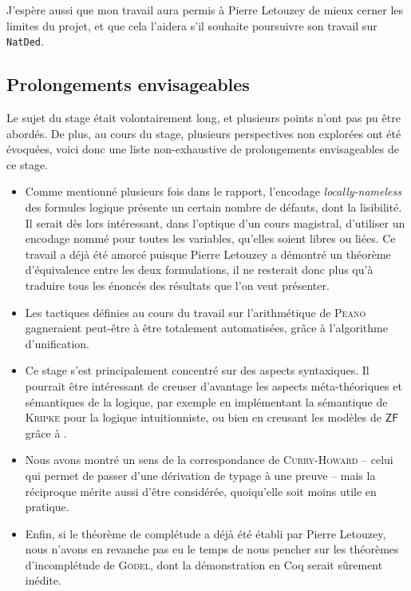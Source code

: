 \documentclass[a4paper]{article}
\newcommand{\ZF}{\mathsf{ZF}}
\theoremstyle{remark}
\theoremstyle{remark}
\theoremstyle{remark}
\theoremstyle{definition}
\theoremstyle{definition}
\theoremstyle{definition}
\begin{document}
J'espère aussi que mon travail aura permis à Pierre Letouzey de mieux cerner les limites du projet, et que cela l'aidera s'il souhaite poursuivre son travail sur \verb+NatDed+.

\subsection*{Prolongements envisageables}

Le sujet du stage était volontairement long, et plusieurs points n'ont pas pu être abordés. De plus, au cours du stage, plusieurs perspectives non explorées ont été évoquées, voici donc une liste non-exhaustive de prolongements envisageables de ce stage.

\begin{itemize}[label=$\bigstar$]
\item Comme mentionné plusieurs fois dans le rapport, l'encodage \emph{locally-nameless} des formules logique présente un certain nombre de défauts, dont la lisibilité. Il serait dès lors intéressant, dans l'optique d'un cours magistral, d'utiliser un encodage nommé pour toutes les variables, qu'elles soient libres ou liées. Ce travail a déjà été amorcé puisque Pierre Letouzey a démontré un théorème d'équivalence entre les deux formulations, il ne resterait donc plus qu'à traduire tous les énoncés des résultats que l'on veut présenter.

\item Les tactiques définies au cours du travail sur l'arithmétique de \textsc{Peano} gagneraient peut-être à être totalement automatisées, grâce à l'algorithme d'unification.

\item Ce stage s'est principalement concentré sur des aspects syntaxiques. Il pourrait être intéressant de creuser d'avantage les aspects méta-théoriques et sémantiques de la logique, par exemple en implémentant la sémantique de \textsc{Kripke} pour la logique intuitionniste, ou bien en creusant les modèles de $\ZF$ grâce à \cite{zfmod}.

\item Nous avons montré un sens de la correspondance de \textsc{Curry-Howard} -- celui qui permet de passer d'une dérivation de typage à une preuve -- mais la réciproque mérite aussi d'être considérée, quoiqu'elle soit moins utile en pratique.

\item Enfin, si le théorème de complétude a déjà été établi par Pierre Letouzey, nous n'avons en revanche pas eu le temps de nous pencher sur les théorèmes d'incomplétude de \textsc{Gödel}, dont la démonstration en Coq serait sûrement inédite.
\end{itemize}
\end{document}
